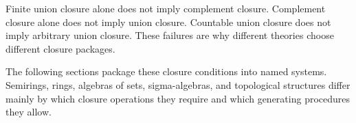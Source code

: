 \begin{remark*}
Finite union closure alone does not imply complement closure.  Complement
closure alone does not imply union closure.  Countable union closure does not
imply arbitrary union closure.  These failures are why different theories
choose different closure packages.
\end{remark*}

\begin{remark*}
The following sections package these closure conditions into named systems.
Semirings, rings, algebras of sets, sigma-algebras, and topological
structures differ mainly by which closure operations they require and which
generating procedures they allow.
\end{remark*}
